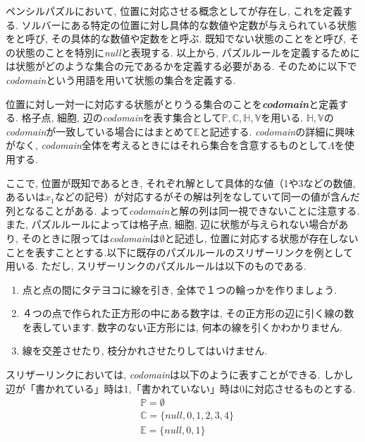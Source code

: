 ペンシルパズルにおいて, 位置に対応させる概念としてが存在し, これを定義する. ソルバーにある特定の位置に対し具体的な数値や定数が与えられている状態をと呼び, その具体的な数値や定数をと呼ぶ. 既知でない状態のことをと呼び, その状態のことを特別に\textit{null}と表現する.
以上から, パズルルールを定義するためには状態がどのような集合の元であるかを定義する必要がある. そのために以下で\textit{codomain}という用語を用いて状態の集合を定義する.

\begin{definition}\label{definition:Codomain}
  位置に対し一対一に対応する状態がとりうる集合のことを\textbf{\textit{codomain}}と定義する. 格子点, 細胞, 辺の\textit{codomain}を表す集合として$\mathbb{P},\mathbb{C},\mathbb{H},\mathbb{V}$を用いる. $\mathbb{H},\mathbb{V}$の\textit{codomain}が一致している場合にはまとめて$\mathbb{E}$と記述する. \textit{codomain}の詳細に興味がなく, \textit{codomain}全体を考えるときにはそれら集合を含意するものとして$\Lambda$を使用する.
\end{definition}

ここで, 位置が既知であるとき, それぞれ解として具体的な値（1や3などの数値, あるいは$x_1$などの記号）が対応するがその解は列をなしていて同一の値が含んだ列となることがある.
よって\textit{codomain}と解の列は同一視できないことに注意する. また, パズルルールによっては格子点, 細胞, 辺に状態が与えられない場合があり, そのときに限っては\textit{codomain}は$\emptyset$と記述し, 位置に対応する状態が存在しないことを表すこととする.以下に既存のパズルルールのスリザーリンクを例として用いる. ただし, スリザーリンクのパズルルールは以下のものである. \cite{web:SlitherLink}

\begin{enumerate}
  \item 点と点の間にタテヨコに線を引き, 全体で１つの輪っかを作りましょう.
  \item ４つの点で作られた正方形の中にある数字は, その正方形の辺に引く線の数を表しています. 数字のない正方形には, 何本の線を引くかわかりません.
  \item 線を交差させたり, 枝分かれさせたりしてはいけません.
\end{enumerate}



\begin{example}\label{example:SlitherLinkCodomain}
  スリザーリンクにおいては, \textit{codomain}は以下のように表すことができる. しかし辺が「書かれている」時は1,「書かれていない」時は0に対応させるものとする.
  \begin{align*}
     & \mathbb{P}  =  \emptyset                   \\
     & \mathbb{C}  =  \{\textit{null},0,1,2,3,4\} \\
     & \mathbb{E}  =  \{\textit{null},0,1\}
  \end{align*}
\end{example}



